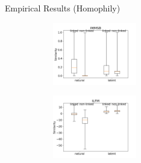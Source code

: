 \begin{frame}[c]{Empirical Results (Homophily)}
    \begin{figure}[ht]
    \caption{Natural and latent similarities aggregated over all datasets and computed on linked and non-linked pairs of nodes for IMMSB (left) and ILFM (right).}
    \centering
        \begin{subfigure}
             \centering
                 \includegraphics[width=0.4\textwidth]{img/homo_mustach_immsb}
        \end{subfigure}
        \begin{subfigure}
                 \centering
              \includegraphics[width=0.4\textwidth]{img/homo_mustach_ilfm}
        \end{subfigure}
        \label{fig:homo_mustach}
    \end{figure}
\end{frame}


